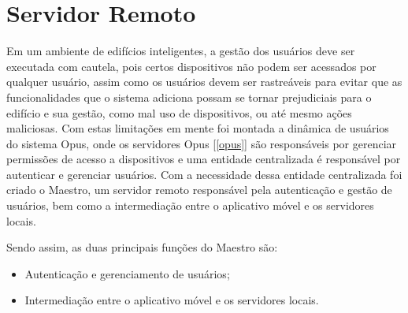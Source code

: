 \chapter{Servidor Remoto}
\label{chap:maestro}
Em um ambiente de edifícios inteligentes, a gestão dos usuários deve ser executada com cautela, pois certos dispositivos não podem
ser acessados por qualquer usuário, assim como os usuários devem ser rastreáveis para evitar que as funcionalidades que o sistema adiciona
possam se tornar prejudiciais para o edifício e sua gestão, como mal uso de dispositivos, ou até mesmo ações maliciosas. Com estas limitações
em mente foi montada a dinâmica de usuários do sistema Opus, onde os servidores Opus [\ref{opus}] são responsáveis por gerenciar permissões
de acesso a dispositivos e uma entidade centralizada é responsável por autenticar e gerenciar usuários. Com a necessidade dessa entidade centralizada
foi criado o Maestro, um servidor remoto responsável pela autenticação e gestão de usuários, bem como a intermediação entre o aplicativo móvel e 
os servidores locais.

Sendo assim, as duas principais funções do Maestro são:
\begin{itemize}
    \item Autenticação e gerenciamento de usuários;
    \item Intermediação entre o aplicativo móvel e os servidores locais.
\end{itemize}

